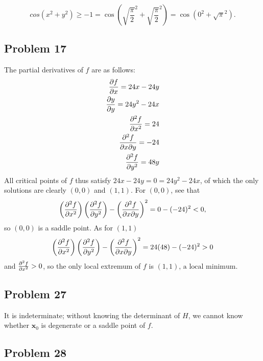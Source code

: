 \documentclass[11pt]{article}
\renewcommand{\vec}[1]{\mathbf{#1}}
\begin{document}
\[
	cos(x^{2} + y^{2}) \ge -1 = \cos \left( \sqrt{\frac{\pi}{2}}^{2} + \sqrt{\frac{\pi}{2}}^{2} \right) = \cos(0^{2} + \sqrt{\pi}^{2}).
\]


\subsection{Problem 17}

The partial derivatives of $f$ are as follows:
\begin{align*}
	\pdv{f}{x} = 24x - 24y \\
	\pdv{y}{y} = 24y^{2} - 24x \\
	\pdv[2]{f}{x} = 24 \\
	\pdv[2]{f}{x}{y} = -24 \\
	\pdv[2]{f}{y} = 48y \\
\end{align*}
All critical points of $f$ thus satisfy $24x - 24y = 0 = 24y^{2} - 24x$, of which the only solutions are clearly $(0, 0)$ and $(1, 1)$. For $(0, 0)$, see that
\[
	\left( \pdv[2]{f}{x} \right) \left( \pdv[2]{f}{y} \right) - \left( \pdv[2]{f}{x}{y} \right)^{2} = 0 - (-24)^{2} < 0,
\]
so $(0, 0)$ is a saddle point. As for $(1, 1)$
\[
	\left( \pdv[2]{f}{x} \right) \left( \pdv[2]{f}{y} \right) - \left( \pdv[2]{f}{x}{y} \right)^{2} = 24(48) - (-24)^{2} > 0
\]
and $\pdv[2]{f}{x} > 0$, so the only local extremum of $f$ is $\boxed{\text{$(1, 1)$, a local minimum}}$.


\subsection{Problem 27}

It is $\boxed{\text{indeterminate}}$; without knowing the determinant of $H$, we cannot know whether $\vec{x}_{0}$ is degenerate or a saddle point of $f$.


\subsection{Problem 28}
\end{document}
